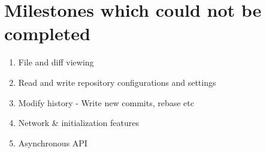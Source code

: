 \section{Milestones which could not be completed}
\begin{enumerate}
	\item File and diff viewing
    \item Read and write repository configurations and settings
    \item Modify history - Write new commits, rebase etc
    \item Network \& initialization features
    \item Asynchronous API
\end{enumerate}
